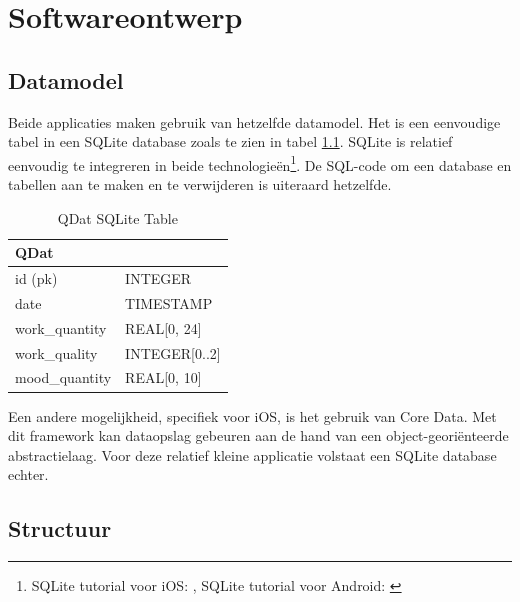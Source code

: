 \chapter{Softwareontwerp}\label{chapter:softwareontwerp}


\section{Datamodel}\label{section:data_model}

Beide applicaties maken gebruik van hetzelfde datamodel. Het is een eenvoudige tabel in een SQLite database zoals te zien in tabel \ref{tab:qdat}. SQLite is relatief eenvoudig te integreren in beide technologie\"en\footnote{SQLite tutorial voor iOS: \cite{techotopia2012sqlite}, SQLite tutorial voor Android: \cite{android2013sqlite}}. De SQL-code om een database en tabellen aan te maken en te verwijderen is uiteraard hetzelfde.

\begin{table}[h]
\caption{QDat SQLite Table}
\begin{center}
	\begin{tabular}{ l l } %
		\hline
		\textbf{QDat}		&									\\
		\hline
		id (pk)					&		INTEGER 			\\
		date 						&		TIMESTAMP 		\\
		work\_quantity	&		REAL[0, 24]		\\
		work\_quality		&		INTEGER[0..2]	\\
		mood\_quantity	&		REAL[0, 10]		\\
		\hline
	\end{tabular}
\end{center}
\label{tab:qdat}
\end{table}

Een andere mogelijkheid, specifiek voor iOS, is het gebruik van Core Data. Met dit framework kan dataopslag gebeuren aan de hand van een object-geori\"enteerde abstractielaag\cite{techotopia2012coredata}. Voor deze relatief kleine applicatie volstaat een SQLite database echter.



\section{Structuur}\label{section:structuur}

